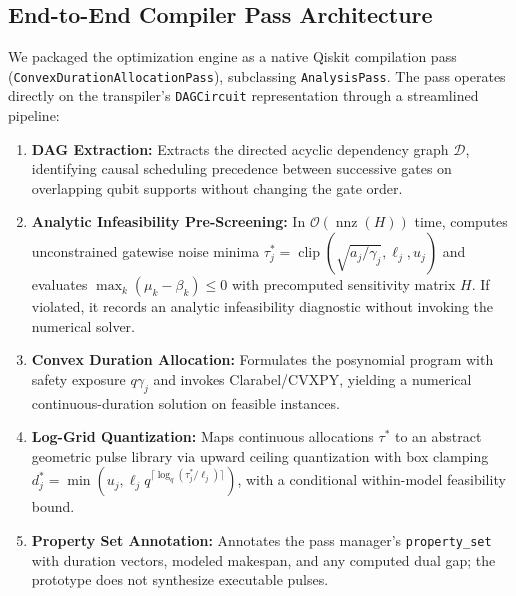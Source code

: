 \documentclass[10pt,letterpaper,journal]{IEEEtran}
\begin{document}
\subsection{End-to-End Compiler Pass Architecture}
We packaged the optimization engine as a native Qiskit compilation pass (\texttt{ConvexDurationAllocationPass}), subclassing \texttt{AnalysisPass}. The pass operates directly on the transpiler's \texttt{DAGCircuit} representation through a streamlined pipeline:
\begin{enumerate}
\item \textbf{DAG Extraction:} Extracts the directed acyclic dependency graph $\mathcal{D}$, identifying causal scheduling precedence between successive gates on overlapping qubit supports without changing the gate order.
\item \textbf{Analytic Infeasibility Pre-Screening:} In $\mathcal{O}(\operatorname{nnz}(H))$ time, computes unconstrained gatewise noise minima $\tau_j^* = \operatorname{clip}(\sqrt{a_j/\gamma_j}, \ell_j, u_j)$ and evaluates $\max_k (\mu_k - \beta_k) \le 0$ with precomputed sensitivity matrix $H$. If violated, it records an analytic infeasibility diagnostic without invoking the numerical solver.
\item \textbf{Convex Duration Allocation:} Formulates the posynomial program with safety exposure $q\gamma_j$ and invokes Clarabel/CVXPY, yielding a numerical continuous-duration solution on feasible instances.
\item \textbf{Log-Grid Quantization:} Maps continuous allocations $\tau^*$ to an abstract geometric pulse library via upward ceiling quantization with box clamping $d_j^* = \min(u_j, \ell_j q^{\lceil \log_q (\tau_j^* / \ell_j) \rceil})$, with a conditional within-model feasibility bound.
\item \textbf{Property Set Annotation:} Annotates the pass manager's \texttt{property\_set} with duration vectors, modeled makespan, and any computed dual gap; the prototype does not synthesize executable pulses.
\end{enumerate}
\end{document}
